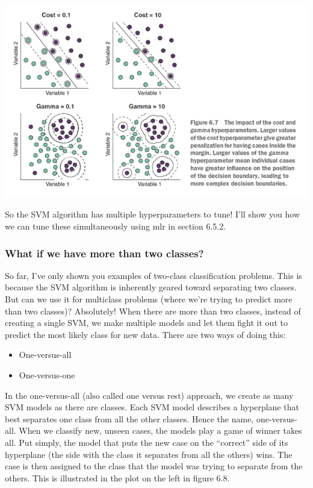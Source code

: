 \documentclass[
]{article}
\providecommand{\tightlist}{%
  \setlength{\itemsep}{0pt}\setlength{\parskip}{0pt}}
\begin{document}
\includegraphics[width=8.67in]{svm4}

So the SVM algorithm has multiple hyperparameters to tune! I'll show you
how we can tune these simultaneously using mlr in section 6.5.2.

\subsubsection{What if we have more than two
classes?}\label{what-if-we-have-more-than-two-classes-1}

So far, I've only shown you examples of two-class classification
problems. This is because the SVM algorithm is inherently geared toward
separating two classes. But can we use it for multiclass problems (where
we're trying to predict more than two classes)? Absolutely! When there
are more than two classes, instead of creating a single SVM, we make
multiple models and let them fight it out to predict the most likely
class for new data. There are two ways of doing this:

\begin{itemize}
\tightlist
\item
  One-versus-all
\item
  One-versus-one
\end{itemize}

In the one-versus-all (also called one versus rest) approach, we create
as many SVM models as there are classes. Each SVM model describes a
hyperplane that best separates one class from all the other classes.
Hence the name, one-versus-all. When we classify new, unseen cases, the
models play a game of winner takes all. Put simply, the model that puts
the new case on the ``correct'' side of its hyperplane (the side with
the class it separates from all the others) wins. The case is then
assigned to the class that the model was trying to separate from the
others. This is illustrated in the plot on the left in figure 6.8.
\end{document}
